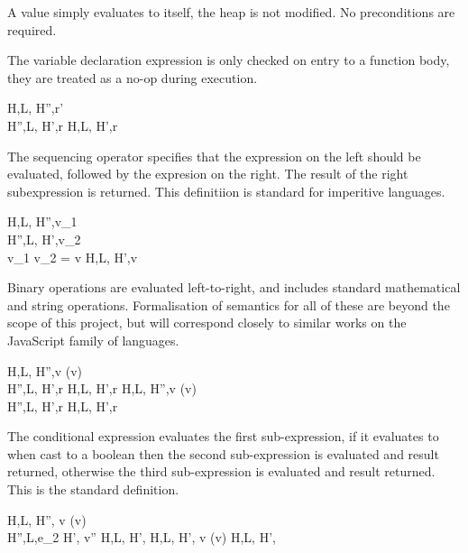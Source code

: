 \documentclass[a4paper,notitlepage]{report}
\begin{document}

  A value simply evaluates to itself, the heap is not modified. No preconditions
  are required.

  
  The variable declaration expression is only checked on entry to a function
  body, they are treated as a no-op during execution.

    {H,L, \evalsto H'',r' \\
     H'',L, \evalsto H',r}
   {H,L, \evalsto H',r}
  \nopagebreak

  The sequencing operator specifies that the expression on the left should be
  evaluated, followed by the expresion on the right. The result of the right
  subexpression is returned. This definitiion is standard for imperitive
  languages.

    {H,L, \gevalsto H'',v_1 \\
     H'',L, \gevalsto H',v_2\\
     v_1 \oplus v_2 = v}
   {H,L, \evalsto H',v}

  Binary operations are evaluated left-to-right, and includes standard
  mathematical and string operations. Formalisation of semantics for all of these
  are beyond the scope of this project, but will correspond closely to similar
  works on the JavaScript family of languages.

  {H,L, \gevalsto H'',v \quad \istrue(v) \\
   H'',L, \evalsto H',r}
  {H,L, \evalsto H',r}
\qquad
  {H,L, \gevalsto H'',v \quad \isfalse(v) \\
   H'',L, \evalsto H',r}
  {H,L, \evalsto H',r}

  The conditional expression evaluates the first sub-expression, if it evaluates
  to  when cast to a boolean then the second
  sub-expression is evaluated and result returned, otherwise the third
  sub-expression is evaluated and result returned. This is the standard
  definition.


  {H,L, \gevalsto H'', v \quad \istrue(v) \\
   H'',L,e_2 \evalsto H', v''}
  {H,L, \evalsto H',\und}
\qquad
  {H,L, \gevalsto H', v \quad \isfalse(v)}
  {H,L, \evalsto H',\und}
\end{document}
